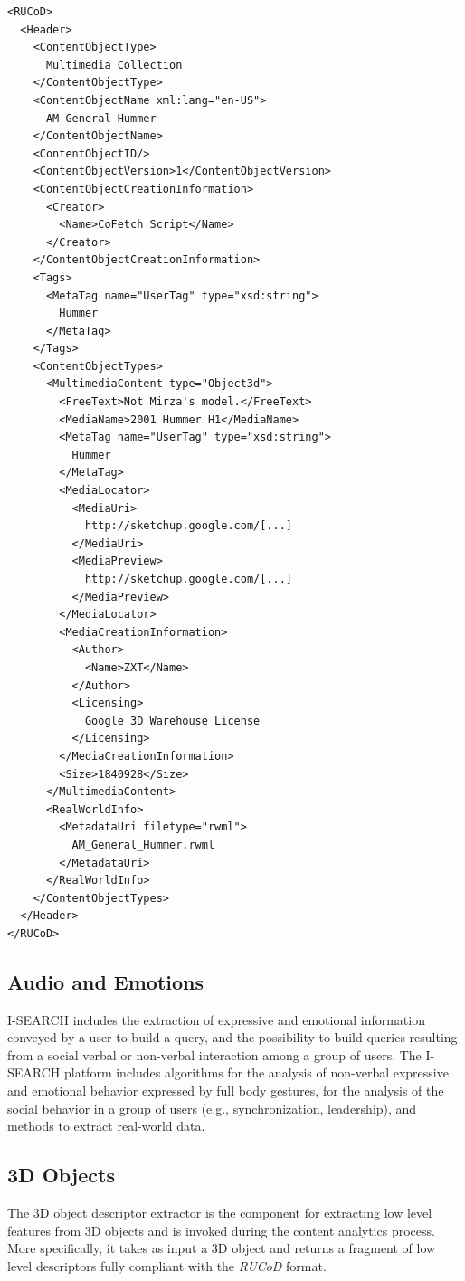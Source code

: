 \documentclass{acm_proc_article-sp}
\let\oldemph\emph
\renewcommand{\emph}[1]{\oldemph{\fontsize{9}{9}\selectfont #1}}
\begin{document}
\begin{lstlisting}[caption=Sample \mbox{\emph{RUCoD}} snippet (namespace declarations and some details removed for legibility reasons).,label={lst:rucod}]
<RUCoD>
  <Header>
    <ContentObjectType>
      Multimedia Collection
    </ContentObjectType>
    <ContentObjectName xml:lang="en-US">
      AM General Hummer
    </ContentObjectName>
    <ContentObjectID/>
    <ContentObjectVersion>1</ContentObjectVersion>
    <ContentObjectCreationInformation>
      <Creator>
        <Name>CoFetch Script</Name>
      </Creator>
    </ContentObjectCreationInformation>
    <Tags>
      <MetaTag name="UserTag" type="xsd:string">
        Hummer
      </MetaTag>
    </Tags>
    <ContentObjectTypes>
      <MultimediaContent type="Object3d">
        <FreeText>Not Mirza's model.</FreeText>
        <MediaName>2001 Hummer H1</MediaName>
        <MetaTag name="UserTag" type="xsd:string">
          Hummer
        </MetaTag>
        <MediaLocator>
          <MediaUri>
            http://sketchup.google.com/[...]
          </MediaUri>
          <MediaPreview>
            http://sketchup.google.com/[...]
          </MediaPreview>
        </MediaLocator>
        <MediaCreationInformation>
          <Author>
            <Name>ZXT</Name>
          </Author>
          <Licensing>
            Google 3D Warehouse License
          </Licensing>
        </MediaCreationInformation>
        <Size>1840928</Size>
      </MultimediaContent>
      <RealWorldInfo>
        <MetadataUri filetype="rwml">
          AM_General_Hummer.rwml
        </MetadataUri>
      </RealWorldInfo>
    </ContentObjectTypes>
  </Header>
</RUCoD>
\end{lstlisting}

\subsection{Audio and Emotions}
\mbox{I-SEARCH} includes the extraction of expressive and emotional information conveyed by a user to build a query, and the possibility to build queries resulting from a social verbal or non-verbal interaction among a group of users.
The \mbox{I-SEARCH} platform includes algorithms for the analysis of non-verbal expressive and emotional behavior expressed by full body gestures, for the analysis of the social behavior in a group of users (e.g., synchronization, leadership), and methods to extract real-world data.

\subsection{3D Objects}
The 3D object descriptor extractor is the component for extracting low level features from 3D objects and is invoked during the content analytics process.
More specifically, it takes as input a 3D object and returns a fragment of low level descriptors fully compliant with the \mbox{\emph{RUCoD}} format.
\end{document}
